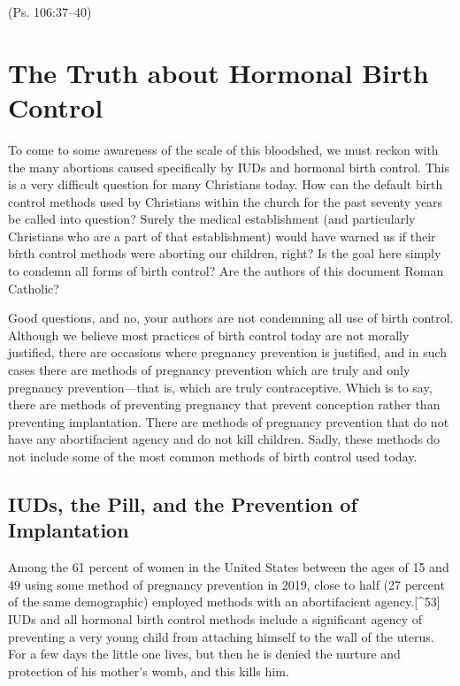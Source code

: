 \documentclass[
]{book}
\begin{document}
(Ps. 106:37--40)

\hypertarget{the-truth-about-hormonal-birth-control}{%
\section{The Truth about Hormonal Birth Control}\label{the-truth-about-hormonal-birth-control}}

To come to some awareness of the scale of this bloodshed, we must reckon with the many abortions caused specifically by IUDs and hormonal birth control. This is a very difficult question for many Christians today. How can the default birth control methods used by Christians within the church for the past seventy years be called into question? Surely the medical establishment (and particularly Christians who are a part of that establishment) would have warned us if their birth control methods were aborting our children, right? Is the goal here simply to condemn all forms of birth control? Are the authors of this document Roman Catholic?

Good questions, and no, your authors are not condemning all use of birth control. Although we believe most practices of birth control today are not morally justified, there are occasions where pregnancy prevention is justified, and in such cases there are methods of pregnancy prevention which are truly and only pregnancy prevention---that is, which are truly contraceptive. Which is to say, there are methods of preventing pregnancy that prevent conception rather than preventing implantation. There are methods of pregnancy prevention that do not have any abortifacient agency and do not kill children. Sadly, these methods do not include some of the most common methods of birth control used today.

\hypertarget{iuds-the-pill-and-the-prevention-of-implantation}{%
\subsection{IUDs, the Pill, and the Prevention of Implantation}\label{iuds-the-pill-and-the-prevention-of-implantation}}

Among the 61 percent of women in the United States between the ages of 15 and 49 using some method of pregnancy prevention in 2019, close to half (27 percent of the same demographic) employed methods with an abortifacient agency.{[}\^{}53{]} IUDs and all hormonal birth control methods include a significant agency of preventing a very young child from attaching himself to the wall of the uterus. For a few days the little one lives, but then he is denied the nurture and protection of his mother's womb, and this kills him.
\end{document}
